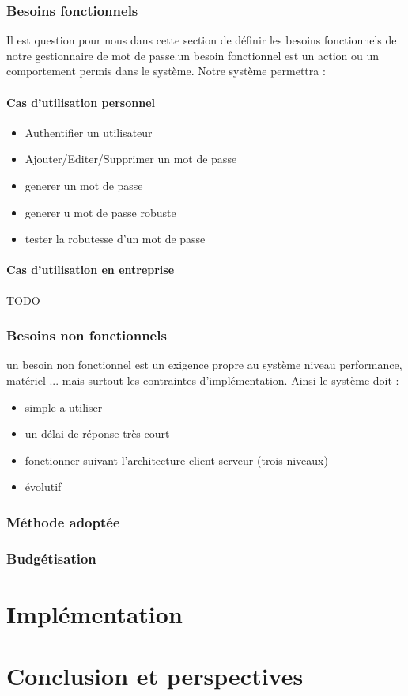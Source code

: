 \documentclass[11pt,a4paper]{report}
\begin{document}
 \subsection{Besoins fonctionnels}
 Il est question pour nous dans cette section de définir les besoins fonctionnels de notre gestionnaire de mot de passe.un besoin fonctionnel est un action ou un comportement permis dans le système. Notre système permettra :
 \subsubsection{Cas d'utilisation personnel}
 \begin{itemize}
 \item Authentifier un utilisateur
 \item Ajouter/Editer/Supprimer un mot de passe
 \item generer un mot de passe
 \item generer u mot de passe robuste
 \item tester la robutesse d'un mot de passe
 \end{itemize}
 
 \subsubsection{Cas d'utilisation en entreprise}
 TODO
 
 \subsection{Besoins non fonctionnels}
 un besoin non fonctionnel est un exigence propre au système niveau performance, matériel ... mais surtout les contraintes d'implémentation. Ainsi le système doit :
 \begin{itemize}
 \item simple a utiliser
 \item un délai de réponse très court
 \item fonctionner suivant l'architecture client-serveur (trois niveaux) 
 \item évolutif
 \end{itemize}
 \subsection{Méthode adoptée}
 \subsection{Budgétisation}
\chapter{Implémentation}
\chapter*{Conclusion et perspectives}
\end{document}
